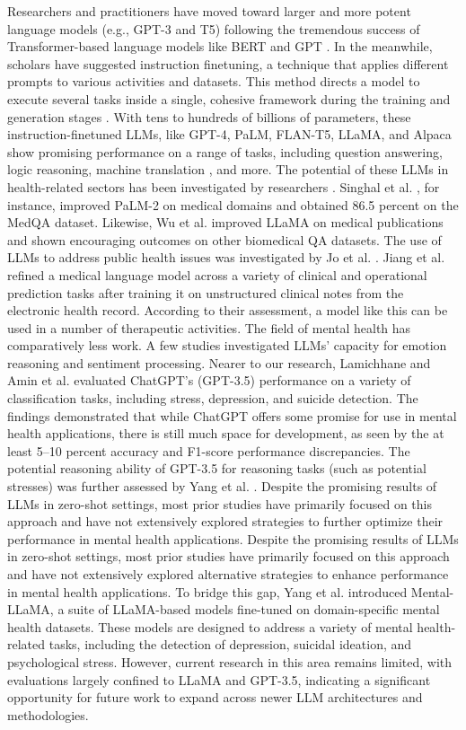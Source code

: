 Researchers and practitioners have moved toward larger and more potent language models (e.g., GPT-3 and T5) following the tremendous success of Transformer-based language models like BERT \cite{devlin2019bert} and GPT \cite{Radford2018}. In the meanwhile, scholars have suggested instruction finetuning, a technique that applies different prompts to various activities and datasets. This method directs a model to execute several tasks inside a single, cohesive framework during the training and generation stages \cite{wei2022finetuned}. With tens to hundreds of billions of parameters, these instruction-finetuned LLMs, like GPT-4, PaLM, FLAN-T5, LLaMA, and Alpaca show promising performance on a range of tasks, including question answering, logic reasoning, machine translation \cite{brants2007large}, and more. The potential of these LLMs in health-related sectors has been investigated by researchers \cite{jiang2023health}. Singhal et al. \cite{singhal2023towards}, for instance, improved PaLM-2 on medical domains and obtained 86.5 percent on the MedQA dataset. Likewise, Wu et al. \cite{Wu2019} improved LLaMA on medical publications and shown encouraging outcomes on other biomedical QA datasets. The use of LLMs to address public health issues was investigated by Jo et al. \cite{jo2023understanding}. Jiang et al. \cite{jiang2023health} refined a medical language model across a variety of clinical and operational prediction tasks after training it on unstructured clinical notes from the electronic health record. According to their assessment, a model like this can be used in a number of therapeutic activities. The field of mental health has comparatively less work. A few studies investigated LLMs' capacity for emotion reasoning and sentiment processing. Nearer to our research, Lamichhane \cite{lamichhane2023evaluation} and Amin et al. \cite{amin2023affective} evaluated ChatGPT's (GPT-3.5) performance on a variety of classification tasks, including stress, depression, and suicide detection. The findings demonstrated that while ChatGPT offers some promise for use in mental health applications, there is still much space for development, as seen by the at least 5–10 percent accuracy and F1-score performance discrepancies. The potential reasoning ability of GPT-3.5 for reasoning tasks (such as potential stresses) was further assessed by Yang et al. \cite{yang2023evaluations}. Despite the promising results of LLMs in zero-shot settings, most prior studies have primarily focused on this approach and have not extensively explored strategies to further optimize their performance in mental health applications. Despite the promising results of LLMs in zero-shot settings, most prior studies have primarily focused on this approach and have not extensively explored alternative strategies to enhance performance in mental health applications. To bridge this gap, Yang et al. \cite{yang2023mental} introduced Mental-LLaMA, a suite of LLaMA-based models fine-tuned on domain-specific mental health datasets. These models are designed to address a variety of mental health-related tasks, including the detection of depression, suicidal ideation, and psychological stress. However, current research in this area remains limited, with evaluations largely confined to LLaMA and GPT-3.5, indicating a significant opportunity for future work to expand across newer LLM architectures and methodologies.